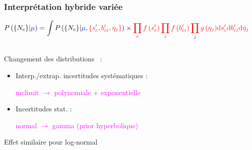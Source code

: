 \begin{frame}
\frametitle{Interpr\'etation hybride vari\'ee}

\vspace*{-0.5cm}
\begin{center}
\begin{small}
\[
\hspace*{-0.2cm}
P\left(\{\nc\}|\textcolor{blue}{\mu}\right)=\displaystyle\int P\left(\{\nc\}|\textcolor{blue}{\mu},\textcolor{red}{\{\scc',\bci',\eta_j\}}\right)\times \textcolor{red}{\prod\limits_{c}f\left(\scc'\right)\prod\limits_{i}f\left(\bci'\right)\prod\limits_{j}g\left(\eta_j\right)}\textcolor{red}{\dd\scc'\dd\bci'\dd\eta_j}
\]
\end{small}
\end{center}
\vspace*{-0.5cm}
\begin{columns}
\begin{column}{0.7\textwidth}
\begin{footnotesize}
\begin{maliste}
\item Changement des distributions \prior~:
\begin{itemize}
\item Interp./extrap. incertitudes syst\'ematiques : 
\vspace*{-0.1cm}
\begin{center}
\textcolor{magenta}{mclimit $\rightarrow$ polynomiale + exponentielle}
\end{center}
\vspace*{0.1cm}
\item Incertitudes stat. : 
\vspace*{-0.1cm}
\begin{center}
\textcolor{magenta}{normal $\rightarrow$ gamma (prior hyperbolique)}
\end{center}
\end{itemize}
\vspace*{0.1cm}
\item Effet similaire pour  log-normal
\end{maliste}
\end{footnotesize}
\end{column}
\begin{column}{0.3\textwidth}
\hspace*{0.5cm}
\vspace*{-0.5cm}

\end{column}
\end{columns}
\end{frame}

